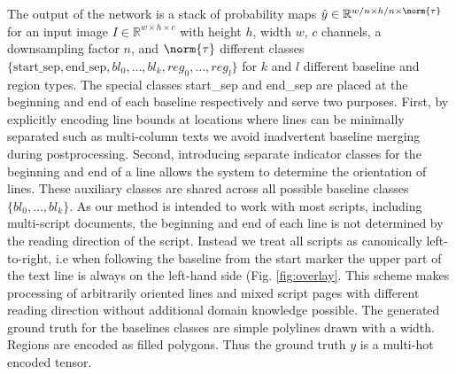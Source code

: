 The output of the network is a stack of probability maps $\hat{y} \in
\mathbb{R}^{w/n \times h/n \times \norm{\tau}}$ for an input image $I \in
\mathbb{R}^{w\times h\times c}$ with height $h$, width $w$, $c$ channels, a
downsampling factor $n$, and $\norm{\tau}$ different classes $\{\text{start\_sep},
\text{end\_sep}, bl_0, \dots, bl_k, reg_0, \dots, reg_l\}$ for $k$ and $l$ different
baseline and region types. The special classes start\_sep and end\_sep are
placed at the beginning and end of each baseline respectively and serve two
purposes. First, by explicitly encoding line bounds at locations where lines
can be minimally separated such as multi-column texts we avoid inadvertent
baseline merging during postprocessing. Second, introducing separate indicator
classes for the beginning and end of a line allows the system to determine the
orientation of lines. These auxiliary classes are shared across all possible
baseline classes $\{bl_0, \dots, bl_k\}$. As our method is intended to work
with most scripts, including multi-script documents, the beginning and end of
each line is not determined by the reading direction of the script. Instead we
treat all scripts as canonically left-to-right, i.e when following the baseline
from the start marker the upper part of the text line is always on the
left-hand side (Fig. \ref{fig:overlay}. This scheme makes processing of
arbitrarily oriented lines and mixed script pages with different reading
direction without additional domain knowledge possible. The generated ground
truth for the baselines classes are simple polylines drawn with a width.
Regions are encoded
as filled polygons. Thus the ground truth $y$ is a multi-hot encoded tensor.


